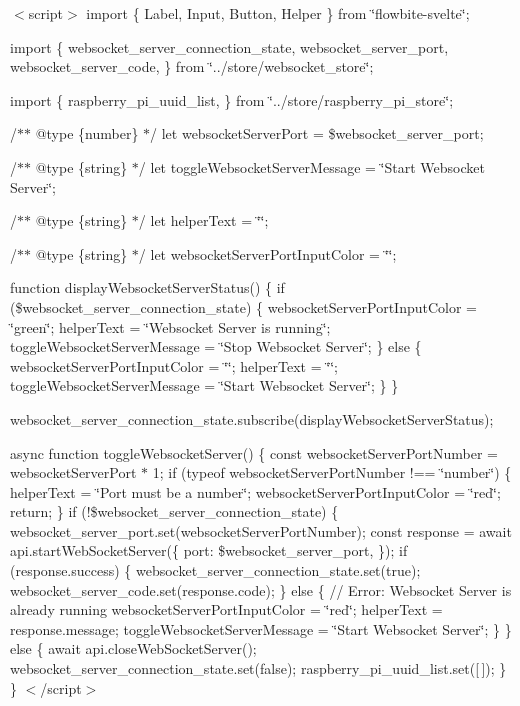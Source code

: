 $<$script$>$ import \{ Label, Input, Button, Helper \} from \char`\"{}flowbite-\/svelte\char`\"{};

import \{ websocket\+\_\+server\+\_\+connection\+\_\+state, websocket\+\_\+server\+\_\+port, websocket\+\_\+server\+\_\+code, \} from \char`\"{}../store/websocket\+\_\+store\char`\"{};

import \{ raspberry\+\_\+pi\+\_\+uuid\+\_\+list, \} from \char`\"{}../store/raspberry\+\_\+pi\+\_\+store\char`\"{};

/$\ast$$\ast$ @type \{number\} $\ast$/ let websocket\+Server\+Port = \$websocket\+\_\+server\+\_\+port;

/$\ast$$\ast$ @type \{string\} $\ast$/ let toggle\+Websocket\+Server\+Message = \char`\"{}\+Start Websocket Server\char`\"{};

/$\ast$$\ast$ @type \{string\} $\ast$/ let helper\+Text = \char`\"{}\char`\"{};

/$\ast$$\ast$ @type \{string\} $\ast$/ let websocket\+Server\+Port\+Input\+Color = \char`\"{}\char`\"{};

function display\+Websocket\+Server\+Status() \{ if (\$websocket\+\_\+server\+\_\+connection\+\_\+state) \{ websocket\+Server\+Port\+Input\+Color = \char`\"{}green\char`\"{}; helper\+Text = \char`\"{}\+Websocket Server is running\char`\"{}; toggle\+Websocket\+Server\+Message = \char`\"{}\+Stop Websocket Server\char`\"{}; \} else \{ websocket\+Server\+Port\+Input\+Color = \char`\"{}\char`\"{}; helper\+Text = \char`\"{}\char`\"{}; toggle\+Websocket\+Server\+Message = \char`\"{}\+Start Websocket Server\char`\"{}; \} \}

websocket\+\_\+server\+\_\+connection\+\_\+state.\+subscribe(display\+Websocket\+Server\+Status);

async function toggle\+Websocket\+Server() \{ const websocket\+Server\+Port\+Number = websocket\+Server\+Port $\ast$ 1; if (typeof websocket\+Server\+Port\+Number !== \char`\"{}number\char`\"{}) \{ helper\+Text = \char`\"{}\+Port must be a number\char`\"{}; websocket\+Server\+Port\+Input\+Color = \char`\"{}red\char`\"{}; return; \} if (!\$websocket\+\_\+server\+\_\+connection\+\_\+state) \{ websocket\+\_\+server\+\_\+port.\+set(websocket\+Server\+Port\+Number); const response = await api.\+start\+Web\+Socket\+Server(\{ port\+: \$websocket\+\_\+server\+\_\+port, \}); if (response.\+success) \{ websocket\+\_\+server\+\_\+connection\+\_\+state.\+set(true); websocket\+\_\+server\+\_\+code.\+set(response.\+code); \} else \{ // Error\+: Websocket Server is already running websocket\+Server\+Port\+Input\+Color = \char`\"{}red\char`\"{}; helper\+Text = response.\+message; toggle\+Websocket\+Server\+Message = \char`\"{}\+Start Websocket Server\char`\"{}; \} \} else \{ await api.\+close\+Web\+Socket\+Server(); websocket\+\_\+server\+\_\+connection\+\_\+state.\+set(false); raspberry\+\_\+pi\+\_\+uuid\+\_\+list.\+set(\mbox{[}$\,$\mbox{]}); \} \} $<$/script$>$


